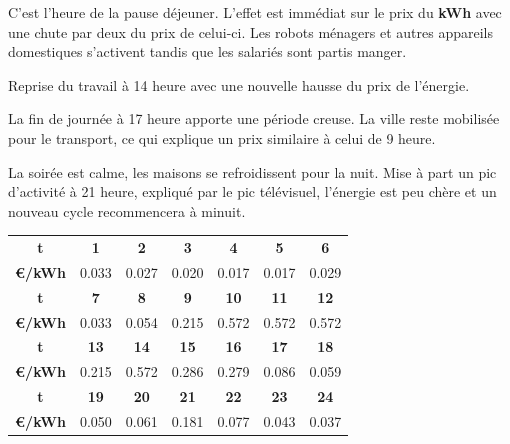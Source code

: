 C'est l'heure de la pause déjeuner. L'effet est immédiat sur le prix du \textbf{kWh} avec une chute par deux du prix
de celui-ci. Les robots ménagers et autres appareils domestiques s'activent tandis que les salariés sont partis manger.

Reprise du travail à 14 heure avec une nouvelle hausse du prix de l'énergie.

La fin de journée à 17 heure apporte une période creuse. La ville reste mobilisée pour le transport, ce qui explique
un prix similaire à celui de 9 heure.

La soirée est calme, les maisons se refroidissent pour la nuit. Mise à part un pic d'activité à 21 heure, expliqué par le
pic télévisuel, l'énergie est peu chère et un nouveau cycle recommencera à minuit.

\begin{tabular}{ | c | c | c | c | c | c | c | }
  \hline
  \textbf{t} & \textbf{1} & \textbf{2} & \textbf{3} & \textbf{4} & \textbf{5} & \textbf{6} \\
  \textbf{€/kWh} & 0.033 & 0.027 & 0.020 & 0.017 & 0.017 & 0.029 \\
  \hline
  \textbf{t} & \textbf{7} & \textbf{8} & \textbf{9} & \textbf{10} & \textbf{11} & \textbf{12} \\
  \textbf{€/kWh} & 0.033 & 0.054 & 0.215 & 0.572 & 0.572 & 0.572 \\
  \hline
  \textbf{t} & \textbf{13} & \textbf{14} & \textbf{15} & \textbf{16} & \textbf{17} & \textbf{18} \\
  \textbf{€/kWh} & 0.215 & 0.572 & 0.286 & 0.279 & 0.086 & 0.059 \\
  \hline
  \textbf{t} & \textbf{19} & \textbf{20} & \textbf{21} & \textbf{22} & \textbf{23} & \textbf{24} \\
  \textbf{€/kWh} & 0.050 & 0.061 & 0.181 & 0.077 & 0.043 & 0.037 \\
  \hline
\end{tabular}


